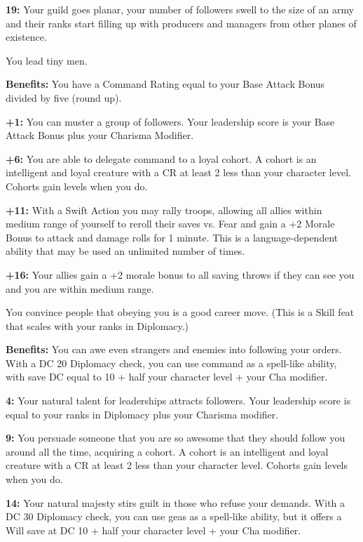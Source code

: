 \textbf{19:} Your guild goes planar, your number of followers swell to the size of an army and their ranks start filling up with producers and managers from other planes of existence.


You lead tiny men.

\textbf{Benefits:} You have a Command Rating equal to your Base Attack Bonus divided by five (round up).

\textbf{+1:} You can muster a group of followers. Your leadership score is your Base Attack Bonus plus your Charisma Modifier.

\textbf{+6:} You are able to delegate command to a loyal cohort. A cohort is an intelligent and loyal creature with a CR at least 2 less than your character level. Cohorts gain levels when you do.

\textbf{+11:} With a Swift Action you may rally troops, allowing all allies within medium range of yourself to reroll their saves vs. Fear and gain a +2 Morale Bonus to attack and damage rolls for 1 minute. This is a language-dependent ability that may be used an unlimited number of times.

\textbf{+16:} Your allies gain a +2 morale bonus to all saving throws if they can see you and you are within medium range.


You convince people that obeying you is a good career move. (This is a Skill feat that scales with your ranks in Diplomacy.)

\textbf{Benefits:} You can awe even strangers and enemies into following your orders. With a DC 20 Diplomacy check, you can use command as a spell-like ability, with save DC equal to 10 + half your character level + your Cha modifier.

\textbf{4:} Your natural talent for leaderships attracts followers. Your leadership score is equal to your ranks in Diplomacy plus your Charisma modifier.

\textbf{9:} You persuade someone that you are so awesome that they should follow you around all the time, acquiring a cohort. A cohort is an intelligent and loyal creature with a CR at least 2 less than your character level. Cohorts gain levels when you do.

\textbf{14:} Your natural majesty stirs guilt in those who refuse your demands. With a DC 30 Diplomacy check, you can use geas as a spell-like ability, but it offers a Will save at DC 10 + half your character level + your Cha modifier.


